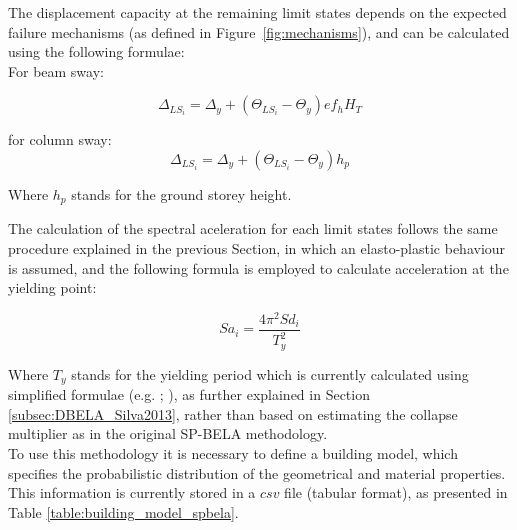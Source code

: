 The displacement capacity at the remaining limit states depends on the expected failure mechanisms (as defined in Figure~\ref{fig:mechanisms}), and can be calculated using the following formulae:\\

For beam sway:

\begin{equation}
	\Delta_{LS_i} = \Delta_y + (\Theta_{LS_i} - \Theta_y)ef_hH_T
\end{equation}

for column sway:
\begin{equation}
	\Delta_{LS_i} = \Delta_y + (\Theta_{LS_i} - \Theta_y)h_p
\end{equation}

Where $h_p$ stands for the ground storey height.

The calculation of the spectral aceleration for each limit states follows the same procedure explained in the previous Section, in which an elasto-plastic behaviour is assumed, and the following formula is employed to calculate acceleration at the yielding point:

\begin{equation}
	Sa_i = \frac{4\pi^2Sd_i}{T_y^2}
\end{equation}

Where $T_y$ stands for the yielding period which is currently calculated using simplified formulae (e.g. \cite{CrowleyPinho2004}; \cite{CrowleyPinho2006}), as further explained in Section \ref{subsec:DBELA_Silva2013}, rather than based on estimating the collapse multiplier as in the original SP-BELA methodology.\\

To use this methodology it is necessary to define a building model, which specifies the probabilistic distribution of the geometrical and material properties. This information is currently stored in a $csv$ file (tabular format), as presented in Table \ref{table:building_model_spbela}.

